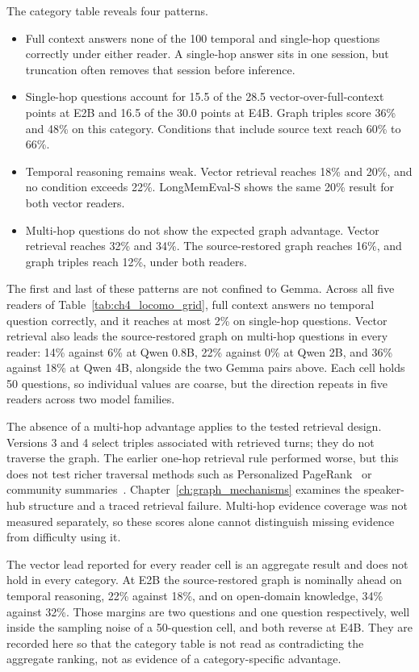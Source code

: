 The category table reveals four patterns.

\begin{itemize}
  \item Full context answers none of the 100 temporal and single-hop questions correctly under
        either reader. A single-hop answer sits in one session, but truncation often removes that
        session before inference.
  \item Single-hop questions account for 15.5 of the 28.5 vector-over-full-context points at E2B
        and 16.5 of the 30.0 points at E4B. Graph triples score 36\% and 48\% on this category.
        Conditions that include source text reach 60\% to 66\%.
  \item Temporal reasoning remains weak. Vector retrieval reaches 18\% and 20\%, and no condition
        exceeds 22\%. LongMemEval-S shows the same 20\% result for both vector readers.
  \item Multi-hop questions do not show the expected graph advantage. Vector retrieval reaches
        32\% and 34\%. The source-restored graph reaches 16\%, and graph triples reach 12\%, under
        both readers.
\end{itemize}

The first and last of these patterns are not confined to Gemma. Across all five readers of
Table~\ref{tab:ch4_locomo_grid}, full context answers no temporal question correctly, and it reaches
at most 2\% on single-hop questions. Vector retrieval also leads the source-restored graph on
multi-hop questions in every reader: 14\% against 6\% at Qwen 0.8B, 22\% against 0\% at Qwen 2B, and
36\% against 18\% at Qwen 4B, alongside the two Gemma pairs above. Each cell holds 50 questions, so
individual values are coarse, but the direction repeats in five readers across two model families.

The absence of a multi-hop advantage applies to the tested retrieval design. Versions 3
and 4 select triples associated with retrieved turns; they do not traverse the graph.
The earlier one-hop retrieval rule performed worse, but this does not test richer traversal
methods such as Personalized PageRank~\citep{hipporag2024} or community
summaries~\citep{graphrag_edge2024}. Chapter~\ref{ch:graph_mechanisms} examines the speaker-hub
structure and a traced retrieval failure. Multi-hop evidence coverage was not measured
separately, so these scores alone cannot distinguish missing evidence from difficulty using it.

The vector lead reported for every reader cell is an aggregate result and does not hold in every
category. At E2B the source-restored graph is nominally ahead on temporal reasoning, 22\% against
18\%, and on open-domain knowledge, 34\% against 32\%. Those margins are two questions and one
question respectively, well inside the sampling noise of a 50-question cell, and both reverse at
E4B. They are recorded here so that the category table is not read as contradicting the aggregate
ranking, not as evidence of a category-specific advantage.

